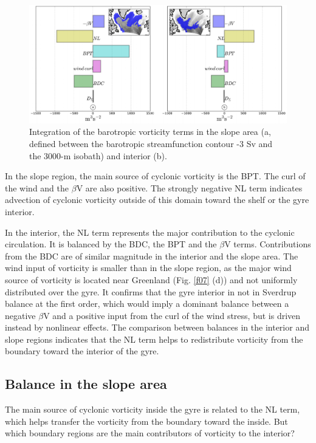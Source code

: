 \documentclass[os, manuscript]{copernicus}
\begin{document}
\begin{figure}[t]
\includegraphics[width=14cm]{../fig_os/f10.pdf}
\caption{Integration of the barotropic vorticity terms in the slope area (a, defined between the barotropic streamfunction contour -3 Sv and the 3000-m isobath) and interior (b).}
\label{f10}
\end{figure} 

In the slope region, the main source of cyclonic vorticity is the BPT. The curl of the wind and the $\beta$V are also positive. The strongly negative NL term indicates advection of cyclonic vorticity outside of this domain toward the shelf or the gyre interior.

In the interior, the NL term represents the major contribution to the cyclonic circulation. It is balanced by the BDC, the BPT and the $\beta$V terms. Contributions from the BDC are of similar magnitude in the interior and the slope area. The wind input of vorticity is smaller than in the slope region, as the major wind source of vorticity is located near Greenland (Fig. \ref{f07} (d)) and not uniformly distributed over the gyre. It confirms that the gyre interior in not in Sverdrup balance at the first order, which would imply a dominant balance between a negative $\beta$V and a positive input from the curl of the wind stress, but is driven instead by nonlinear effects. The comparison between balances in the interior and slope regions indicates that the NL term helps to redistribute vorticity from the boundary toward the interior of the gyre. 

\subsection{Balance in the slope area}

The main source of cyclonic vorticity inside the gyre is related to the NL term, which helps transfer the vorticity from the boundary toward the inside. But which boundary regions are the main contributors of vorticity to the interior? 
\end{document}
